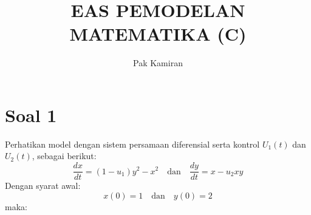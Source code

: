 \documentclass{article}
\title{EAS PEMODELAN MATEMATIKA (C)}
\author{Pak Kamiran}
\date{}
\begin{document}
\pagestyle{fancy}

\maketitle

\section*{Soal 1}

Perhatikan model dengan sistem persamaan diferensial serta kontrol $U_1(t)$ dan $U_2(t)$, sebagai berikut:
\[
\frac{dx}{dt}=(1-u_1)y^2-x^2 \quad \text{dan} \quad \frac{dy}{dt} = x-u_2xy
\]
Dengan syarat awal:
\[
x(0) = 1 \quad \text{dan}\quad y(0) = 2
\]
maka:
\end{document}
